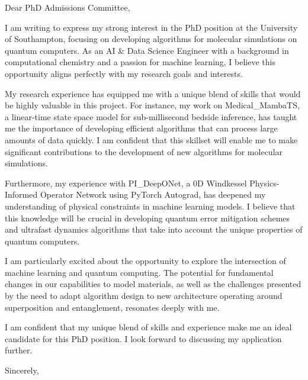 \documentclass{letter}
\begin{document}
\opening{Dear PhD Admissions Committee,}

I am writing to express my strong interest in the PhD position at the University of Southampton, focusing on developing algorithms for molecular simulations on quantum computers. As an AI & Data Science Engineer with a background in computational chemistry and a passion for machine learning, I believe this opportunity aligns perfectly with my research goals and interests.

My research experience has equipped me with a unique blend of skills that would be highly valuable in this project. For instance, my work on Medical_MambaTS, a linear-time state space model for sub-millisecond bedside inference, has taught me the importance of developing efficient algorithms that can process large amounts of data quickly. I am confident that this skillset will enable me to make significant contributions to the development of new algorithms for molecular simulations.

Furthermore, my experience with PI_DeepONet, a 0D Windkessel Physics-Informed Operator Network using PyTorch Autograd, has deepened my understanding of physical constraints in machine learning models. I believe that this knowledge will be crucial in developing quantum error mitigation schemes and ultrafast dynamics algorithms that take into account the unique properties of quantum computers.

I am particularly excited about the opportunity to explore the intersection of machine learning and quantum computing. The potential for fundamental changes in our capabilities to model materials, as well as the challenges presented by the need to adapt algorithm design to new architecture operating around superposition and entanglement, resonates deeply with me.

I am confident that my unique blend of skills and experience make me an ideal candidate for this PhD position. I look forward to discussing my application further.

\closing{Sincerely,}
\signature{Ismail Aissaoui}
\end{document}
